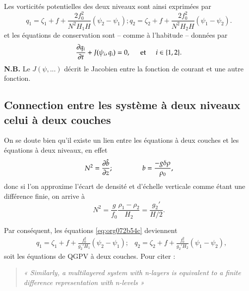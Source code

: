 \documentclass{article}
\numberwithin{equation}{section}
\begin{document}
Les vorticités potentielles des deux niveaux sont ainsi exprimées par
\begin{subequations}
\label{eq:org072b54c}
\begin{equation}
q_1 = \zeta_1 + f + \frac{2 f_0^2}{N^2 H_1 H} (\psi_2 - \psi_1);
\end{equation}
\begin{equation}
q_2 = \zeta_2 + f + \frac{2 f_0^2}{N^2 H_2 H} (\psi_1 - \psi_2).
\end{equation}
\end{subequations}
et les équations de conservation sont -- comme à l'habitude -- données par
\begin{equation}
\pdv{q_i}{t} + J (\psi_i,q_i) = 0,
\hspace{0.5cm} \text{et} \hspace{0.5cm}
i \in \qty{1,2}.
\end{equation}
\textbf{N.B.} Le \(J(\psi,...)\) décrit le Jacobien entre la fonction de courant et une autre fonction.
\vspace{2cm}

\subsection{Connection entre les système à \textbf{deux niveaux} celui à \textbf{deux couches}}
\label{sec:org31c7876}
On se doute bien qu'il existe un lien entre les équations à deux couches et les équations à deux niveaux, en effet
\begin{equation}  
N^2 = \pdv{\hat{b}}{z}; \hspace{1.5cm} b = \frac{-g\delta \rho}{\rho_0},
\end{equation}
donc si l'on approxime l'écart de densité et d'échelle verticale comme étant une différence finie, on arrive à
\begin{equation}
N^2 = \frac{g}{f_0} \frac{\rho_1 - \rho_2}{H_2} = \frac{g_2'}{H/2}.
\end{equation}

Par conséquent, les équations \ref{eq:org072b54c} deviennent
\begin{align}
&q_1 = \zeta_1 + f + \frac{f_0^2}{g_2' H_1} (\psi_2 - \psi_1);
&q_2 = \zeta_2 + f + \frac{f_0^2}{g_2' H_2} (\psi_1 - \psi_2),
\end{align}
soit les équations de QGPV à deux couches.
Pour citer \cite[p.195]{vallis_2006} :
\begin{quote}
\textit{« Similarly, a multilayered system with n-layers is equivalent to a finite difference representation with n-levels »}
\end{quote}
\end{document}
